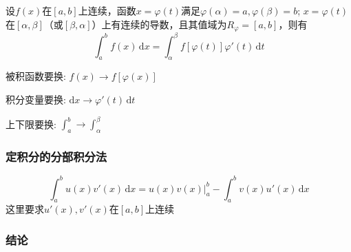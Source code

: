 \documentclass[../book.tex]{subfiles}
\begin{document}
    设$f(x)$在$[a, b]$上连续，函数$x = \varphi(t)$满足$\varphi(\alpha) = a, \varphi(\beta) = b$; $x = \varphi(t)$在$[\alpha, \beta]$（或$[\beta, \alpha]$）上有连续的导数，且其值域为$R_\varphi = [a, b]$，则有
    \[
        \int_a^b f(x)\,\mathrm{d}x = \int_{\alpha}^{\beta} f[\varphi(t)]\varphi'(t)\,\mathrm{d}t
    \]

    \textbf{\color{red}{换元要三换}}
    \begin{circlenum}
        \item 被积函数要换: $f(x) \rightarrow f[\varphi(x)]$
        \item 积分变量要换: $\mathrm{d}x \rightarrow \varphi'(t)\,\mathrm{d}t$
        \item 上下限要换: $\int_{a}^b \rightarrow \int_{\alpha}^{\beta}$
    \end{circlenum}

    \subsubsection{定积分的分部积分法}

    \[
        \int_a^b u(x)v'(x)\,\mathrm{d}x = u(x)v(x)\Big|_a^b - \int_a^b v(x)u'(x)\,\mathrm{d}x
    \]
    这里要求$u'(x), v'(x)$在$[a, b]$上连续

    \subsubsection{结论}
\end{document}
